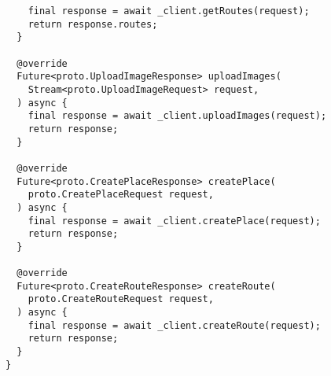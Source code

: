 \begin{verbatim}
    final response = await _client.getRoutes(request);
    return response.routes;
  }

  @override
  Future<proto.UploadImageResponse> uploadImages(
    Stream<proto.UploadImageRequest> request,
  ) async {
    final response = await _client.uploadImages(request);
    return response;
  }

  @override
  Future<proto.CreatePlaceResponse> createPlace(
    proto.CreatePlaceRequest request,
  ) async {
    final response = await _client.createPlace(request);
    return response;
  }

  @override
  Future<proto.CreateRouteResponse> createRoute(
    proto.CreateRouteRequest request,
  ) async {
    final response = await _client.createRoute(request);
    return response;
  }
}
\end{verbatim}

